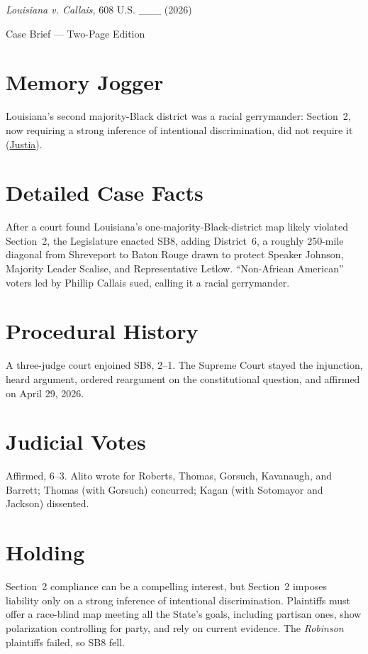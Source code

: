 \documentclass[12pt]{article}
\begin{document}
\begin{center}
{\LARGE \textit{Louisiana v. Callais}, 608 U.S. \_\_\_ (2026)\par}
\vspace{0.5em}
{\large Case Brief --- Two-Page Edition\par}
\end{center}

\section{Memory Jogger}
Louisiana's second majority-Black district was a racial gerrymander: Section~2, now requiring a strong inference of intentional discrimination, did not require it (\href{https://supreme.justia.com/cases/federal/us/608/24-109/}{Justia}).

\section{Detailed Case Facts}
After a court found Louisiana's one-majority-Black-district map likely violated Section~2, the Legislature enacted SB8, adding District~6, a roughly 250-mile diagonal from Shreveport to Baton Rouge drawn to protect Speaker Johnson, Majority Leader Scalise, and Representative Letlow. ``Non-African American'' voters led by Phillip Callais sued, calling it a racial gerrymander.

\section{Procedural History}
A three-judge court enjoined SB8, 2--1. The Supreme Court stayed the injunction, heard argument, ordered reargument on the constitutional question, and affirmed on April 29, 2026.

\section{Judicial Votes}
Affirmed, 6--3. Alito wrote for Roberts, Thomas, Gorsuch, Kavanaugh, and Barrett; Thomas (with Gorsuch) concurred; Kagan (with Sotomayor and Jackson) dissented.

\section{Holding}
Section~2 compliance can be a compelling interest, but Section~2 imposes liability only on a strong inference of intentional discrimination. Plaintiffs must offer a race-blind map meeting all the State's goals, including partisan ones, show polarization controlling for party, and rely on current evidence. The \textit{Robinson} plaintiffs failed, so SB8 fell.
\end{document}
